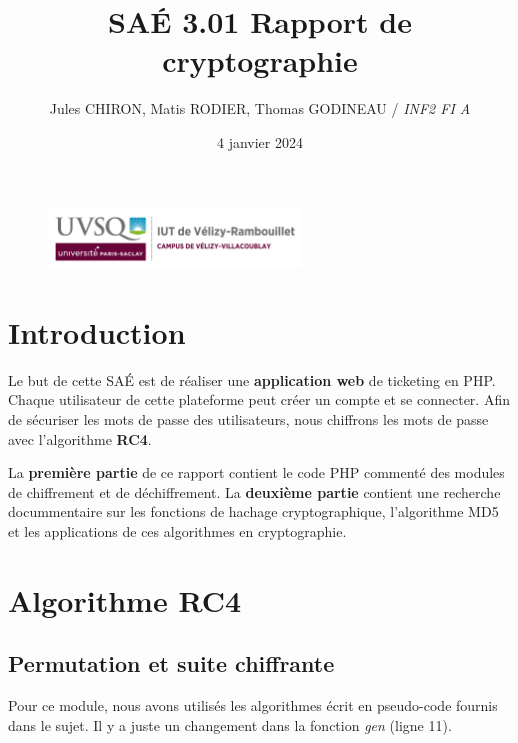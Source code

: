 \documentclass[12pt, a4paper]{article}
\title{SAÉ 3.01 Rapport de cryptographie}
\author{Jules CHIRON, Matis RODIER, Thomas GODINEAU / \textit{INF2 FI A}}
\date{4 janvier 2024}
\begin{document}
\maketitle

\begin{figure}[h]
    \includegraphics[width=0.6\textwidth]{../annexes/logo_uvsq}
\end{figure}

\tableofcontents{}
\section*{Introduction}

Le but de cette SAÉ est de réaliser une \textbf{application web} de ticketing en PHP.\@
Chaque utilisateur de cette plateforme peut créer un compte et se connecter.
Afin de sécuriser les mots de passe des utilisateurs, nous chiffrons les mots de passe avec l'algorithme \textbf{RC4}.
\bigskip

La \textbf{première partie} de ce rapport contient le code PHP commenté des modules de chiffrement et de déchiffrement.
La \textbf{deuxième partie} contient une recherche docummentaire sur les fonctions de hachage cryptographique,
l'algorithme MD5 et les applications de ces algorithmes en cryptographie.

\section{Algorithme RC4}

\subsection*{Permutation et suite chiffrante}

Pour ce module,
nous avons utilisés les algorithmes écrit en pseudo-code fournis dans le sujet.
Il y a juste un changement dans la fonction \textit{gen} (ligne 11).

\end{document}
